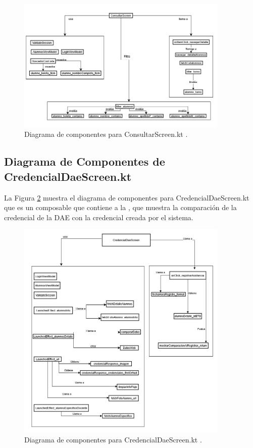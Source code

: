 \begin{figure}[htbp!]
	\begin{center}
		\includegraphics[width=0.9\textwidth]{DiagramasMoviles/DCM (16)}
		\caption{Diagrama de componentes para ConsultarScreen.kt .}
		\label{fig:Componentes_4}
	\end{center}
\end{figure}

\newpage

\subsection{Diagrama de Componentes de CredencialDaeScreen.kt}

La Figura \ref{fig:Componentes_5} muestra el diagrama de componentes para CredencialDaeScreen.kt que es un composable que contiene a la , que muestra la comparación de la credencial de la DAE con la credencial creada por el sistema.

\begin{figure}[htbp!]
	\begin{center}
		\includegraphics[width=0.9\textwidth]{DiagramasMoviles/DCM (17)}
		\caption{Diagrama de componentes para CredencialDaeScreen.kt .}
		\label{fig:Componentes_5}
	\end{center}
\end{figure}

